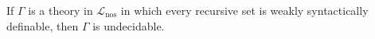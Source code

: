 If $\Gamma$ is a theory in $\mathcal{L}_{\mathrm{nos}}$ in which every recursive set is weakly syntactically definable, then $\Gamma$ is undecidable.
